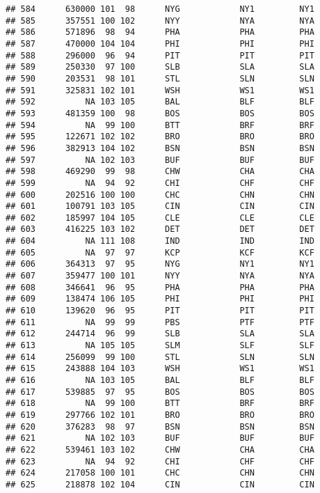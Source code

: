 \documentclass[]{article}
\begin{document}
\begin{verbatim}
## 584      630000 101  98      NYG            NY1         NY1
## 585      357551 100 102      NYY            NYA         NYA
## 586      571896  98  94      PHA            PHA         PHA
## 587      470000 104 104      PHI            PHI         PHI
## 588      296000  96  94      PIT            PIT         PIT
## 589      250330  97 100      SLB            SLA         SLA
## 590      203531  98 101      STL            SLN         SLN
## 591      325831 102 101      WSH            WS1         WS1
## 592          NA 103 105      BAL            BLF         BLF
## 593      481359 100  98      BOS            BOS         BOS
## 594          NA  99 100      BTT            BRF         BRF
## 595      122671 102 102      BRO            BRO         BRO
## 596      382913 104 102      BSN            BSN         BSN
## 597          NA 102 103      BUF            BUF         BUF
## 598      469290  99  98      CHW            CHA         CHA
## 599          NA  94  92      CHI            CHF         CHF
## 600      202516 100 100      CHC            CHN         CHN
## 601      100791 103 105      CIN            CIN         CIN
## 602      185997 104 105      CLE            CLE         CLE
## 603      416225 103 102      DET            DET         DET
## 604          NA 111 108      IND            IND         IND
## 605          NA  97  97      KCP            KCF         KCF
## 606      364313  97  95      NYG            NY1         NY1
## 607      359477 100 101      NYY            NYA         NYA
## 608      346641  96  95      PHA            PHA         PHA
## 609      138474 106 105      PHI            PHI         PHI
## 610      139620  96  95      PIT            PIT         PIT
## 611          NA  99  99      PBS            PTF         PTF
## 612      244714  96  99      SLB            SLA         SLA
## 613          NA 105 105      SLM            SLF         SLF
## 614      256099  99 100      STL            SLN         SLN
## 615      243888 104 103      WSH            WS1         WS1
## 616          NA 103 105      BAL            BLF         BLF
## 617      539885  97  95      BOS            BOS         BOS
## 618          NA  99 100      BTT            BRF         BRF
## 619      297766 102 101      BRO            BRO         BRO
## 620      376283  98  97      BSN            BSN         BSN
## 621          NA 102 103      BUF            BUF         BUF
## 622      539461 103 102      CHW            CHA         CHA
## 623          NA  94  92      CHI            CHF         CHF
## 624      217058 100 101      CHC            CHN         CHN
## 625      218878 102 104      CIN            CIN         CIN

\end{verbatim}
\end{document}
